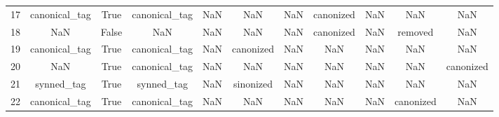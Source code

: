 \begin{table}[h!]
{\begin{tabular}{|c|c|c|c|c|c|c|c|c|c|c|}
         17 &             canonical\_tag &                              True &                canonical\_tag &                                  NaN &                                  NaN &                                  NaN &                            canonized &                                  NaN &                                  NaN &                                                NaN \\
         18 &                       NaN &                             False &                          NaN &                                  NaN &                                  NaN &                                  NaN &                            canonized &                                  NaN &                              removed &                                                NaN \\
         19 &             canonical\_tag &                              True &                canonical\_tag &                                  NaN &                            canonized &                                  NaN &                                  NaN &                                  NaN &                                  NaN &                                                NaN \\
         20 &                       NaN &                              True &                canonical\_tag &                                  NaN &                                  NaN &                                  NaN &                                  NaN &                                  NaN &                                  NaN &                                          canonized \\
         21 &                synned\_tag &                              True &                   synned\_tag &                                  NaN &                            sinonized &                                  NaN &                                  NaN &                                  NaN &                                  NaN &                                                NaN \\
         22 &             canonical\_tag &                              True &                canonical\_tag &                                  NaN &                                  NaN &                                  NaN &                                  NaN &                                  NaN &                            canonized &                                                NaN \\

\end{tabular}}
\end{table}

